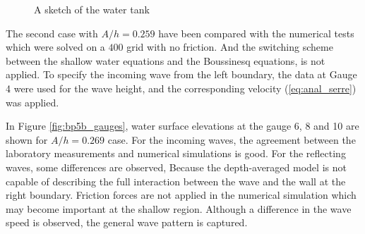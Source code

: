 \documentclass[review]{elsarticle}
\begin{document}
\begin{figure}[!htb]
\centering
{}
  \caption{A sketch of the water tank}
  \label{fig:bp5_water_tank}
\end{figure}

The second case with $A/h=0.259$ have been 
compared with the numerical tests
which were solved on a $400$ grid with no friction.
And the switching scheme between the shallow water equations
and the Boussinesq equations, is not applied.
To specify the incoming wave from the left boundary, 
the data at Gauge 4 were used for the wave height,
and the corresponding velocity (\ref{eq:anal_serre})
was applied.

In Figure \ref{fig:bp5b_gauges}, water surface elevations
at the gauge 6, 8 and 10 are shown for $A/h=0.269$ case. 
For the incoming waves, the agreement 
between the laboratory measurements and numerical simulations is good. 
For the reflecting waves, some differences are observed,
Because the depth-averaged model is not capable 
of describing the full interaction between the wave and the wall
at the right boundary. 
Friction forces are not applied in the numerical simulation
which may become important at the shallow region. 
Although a difference in the wave speed is observed,
the general wave pattern is captured. 
\end{document}
